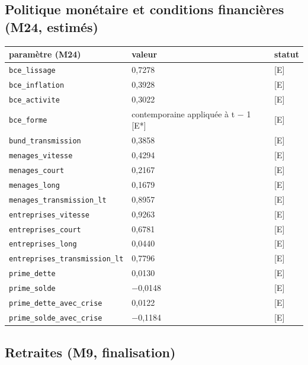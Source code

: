 \documentclass[
  11pt,
  11pt,
  a4paper,
  openany]{book}
\begin{document}
\hypertarget{politique-monuxe9taire-et-conditions-financiuxe8res-m24-estimuxe9s}{%
\subsection{Politique monétaire et conditions financières (M24,
estimés)}\label{politique-monuxe9taire-et-conditions-financiuxe8res-m24-estimuxe9s}}

\begin{longtable}[]{@{}lll@{}}
\toprule\noalign{}
paramètre (M24) & valeur & statut \\
\midrule\noalign{}
\endhead
\bottomrule\noalign{}
\endlastfoot
\texttt{bce\_lissage} & 0,7278 & {[}E{]} \\
\texttt{bce\_inflation} & 0,3928 & {[}E{]} \\
\texttt{bce\_activite} & 0,3022 & {[}E{]} \\
\texttt{bce\_forme} & contemporaine appliquée à t − 1 {[}E*{]} &
{[}E{]} \\
\texttt{bund\_transmission} & 0,3858 & {[}E{]} \\
\texttt{menages\_vitesse} & 0,4294 & {[}E{]} \\
\texttt{menages\_court} & 0,2167 & {[}E{]} \\
\texttt{menages\_long} & 0,1679 & {[}E{]} \\
\texttt{menages\_transmission\_lt} & 0,8957 & {[}E{]} \\
\texttt{entreprises\_vitesse} & 0,9263 & {[}E{]} \\
\texttt{entreprises\_court} & 0,6781 & {[}E{]} \\
\texttt{entreprises\_long} & 0,0440 & {[}E{]} \\
\texttt{entreprises\_transmission\_lt} & 0,7796 & {[}E{]} \\
\texttt{prime\_dette} & 0,0130 & {[}E{]} \\
\texttt{prime\_solde} & −0,0148 & {[}E{]} \\
\texttt{prime\_dette\_avec\_crise} & 0,0122 & {[}E{]} \\
\texttt{prime\_solde\_avec\_crise} & −0,1184 & {[}E{]} \\
\end{longtable}

\hypertarget{retraites-m9-finalisation}{%
\subsection{Retraites (M9,
finalisation)}\label{retraites-m9-finalisation}}
\end{document}
